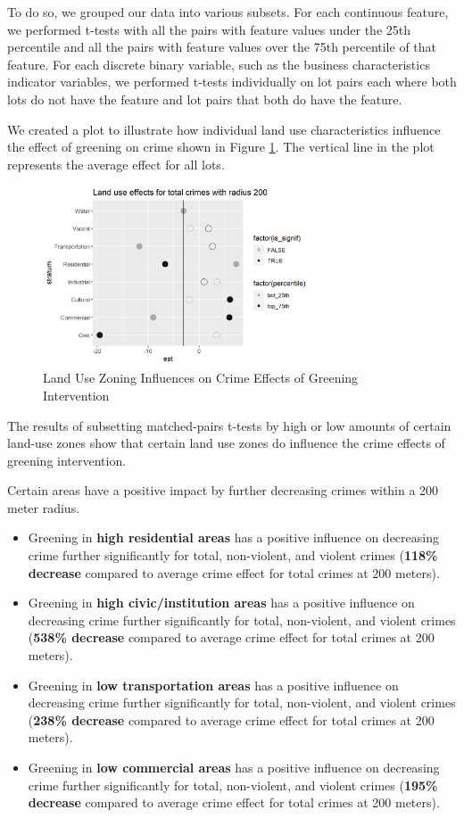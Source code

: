 \documentclass{article}
\begin{document}
To do so, we grouped our data into various subsets. For each continuous feature, we performed t-tests with all the pairs with feature values under the 25th percentile and all the pairs with feature values over the 75th percentile of that feature. For each discrete binary variable, such as the business characteristics indicator variables, we performed t-tests individually on lot pairs each where both lots do not have the feature and lot pairs that both do have the feature.

We created a plot to illustrate how individual land use characteristics influence the effect of greening on crime shown in Figure \ref{fig:figure12}. The vertical line in the plot represents the average effect for all lots.

\begin{figure}[h]
    \includegraphics[width=8cm]{imgs/land_use_stratum_total_200.png}
    \centering
    \caption{Land Use Zoning Influences on Crime Effects of Greening Intervention}    
    \label{fig:figure12}
\end{figure}

The results of subsetting matched-pairs t-tests by high or low amounts of certain land-use zones show that certain land use zones do influence the crime effects of greening intervention.

Certain areas have a positive impact by further decreasing crimes within a 200 meter radius. 
\begin{itemize}
    \item Greening in \textbf{high residential areas} has a positive influence on decreasing crime further significantly for total, non-violent, and violent crimes (\textbf{118\% decrease} compared to average crime effect for total crimes at 200 meters). 
    \item Greening in \textbf{high civic/institution areas} has a positive influence on decreasing crime further significantly for total, non-violent, and violent crimes (\textbf{538\% decrease} compared to average crime effect for total crimes at 200 meters).
    \item Greening in \textbf{low transportation areas} has a positive influence on decreasing crime further significantly for total, non-violent, and violent crimes (\textbf{238\% decrease} compared to average crime effect for total crimes at 200 meters).
    \item Greening in \textbf{low commercial areas} has a positive influence on decreasing crime further significantly for total, non-violent, and violent crimes (\textbf{195\% decrease} compared to average crime effect for total crimes at 200 meters).
\end{itemize}
\end{document}

